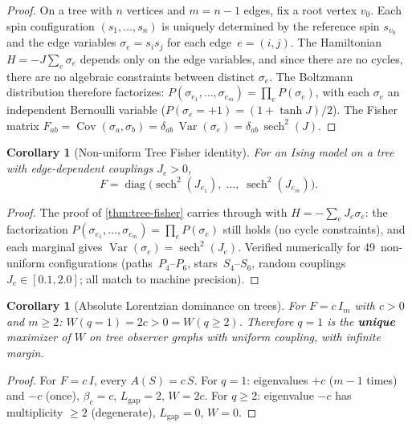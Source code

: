 \documentclass[11pt]{article}
\newtheorem{corollary}[theorem]{Corollary}
\theoremstyle{definition}
\theoremstyle{remark}
\begin{document}
\begin{proof}
On a tree with $n$ vertices and $m = n - 1$ edges, fix a root vertex
$v_0$.
Each spin configuration $(s_1, \ldots, s_n)$ is uniquely determined by
the reference spin $s_{v_0}$ and the edge variables
$\sigma_e = s_i s_j$ for each edge~$e = (i,j)$.
The Hamiltonian $H = -J \sum_e \sigma_e$ depends only on the edge
variables, and since there are no cycles, there are no algebraic
constraints between distinct $\sigma_e$.
The Boltzmann distribution therefore factorizes:
$P(\sigma_{e_1}, \ldots, \sigma_{e_{m}})
= \prod_e P(\sigma_e)$,
with each $\sigma_e$ an independent Bernoulli variable
($P(\sigma_e = +1) = (1 + \tanh J)/2$).
The Fisher matrix $F_{ab} = \operatorname{Cov}(\sigma_a, \sigma_b)
= \delta_{ab}\, \operatorname{Var}(\sigma_e)
= \delta_{ab}\, \operatorname{sech}^2(J)$.
\end{proof}

\begin{corollary}[Non-uniform Tree Fisher identity]
\label{cor:tree-fisher-nonuniform}
For an Ising model on a tree with edge-dependent couplings
$J_e > 0$,
\begin{equation}
\label{eq:tree-fisher-nonuniform}
F = \operatorname{diag}\bigl(
  \operatorname{sech}^2(J_{e_1}),\;\ldots,\;
  \operatorname{sech}^2(J_{e_m})
\bigr).
\end{equation}
\end{corollary}

\begin{proof}
The proof of \cref{thm:tree-fisher} carries through with
$H = -\sum_e J_e \sigma_e$: the factorization
$P(\sigma_{e_1}, \ldots, \sigma_{e_m}) = \prod_e P(\sigma_e)$
still holds (no cycle constraints), and each marginal gives
$\operatorname{Var}(\sigma_e) = \operatorname{sech}^2(J_e)$.
Verified numerically for 49~non-uniform configurations
(paths~$P_4$--$P_6$, stars~$S_4$--$S_6$, random couplings
$J_e \in [0.1, 2.0]$; all match to machine precision).
\end{proof}

\begin{corollary}[Absolute Lorentzian dominance on trees]
\label{cor:tree-lorentzian}
For $F = c\,I_m$ with $c > 0$ and $m \geq 2$:
$W(q = 1) = 2c > 0 = W(q \geq 2)$.
Therefore $q = 1$ is the \textbf{unique} maximizer of $W$ on tree
observer graphs with uniform coupling, with infinite margin.
\end{corollary}

\begin{proof}
For $F = c\,I$, every $A(S) = c\,S$.
For $q = 1$: eigenvalues $+c$ ($m - 1$ times) and $-c$ (once),
$\beta_c = c$, $L_{\mathrm{gap}} = 2$, $W = 2c$.
For $q \geq 2$: eigenvalue $-c$ has multiplicity $\geq 2$
(degenerate), $L_{\mathrm{gap}} = 0$, $W = 0$.
\end{proof}
\end{document}
